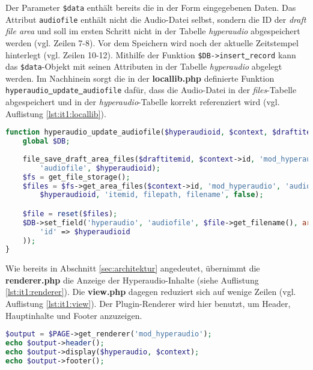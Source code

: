 Der Parameter \texttt{\$data} enthält bereits die in der Form eingegebenen Daten. Das Attribut \mbox{\texttt{audiofile}} enthält nicht die Audio-Datei selbst, sondern die ID der \textit{draft file area} und soll im ersten Schritt nicht in der Tabelle \textit{hyperaudio} abgespeichert werden (vgl. Zeilen 7-8). Vor dem Speichern wird noch der aktuelle Zeitstempel hinterlegt (vgl. Zeilen 10-12). Mithilfe der Funktion \mbox{\texttt{\$DB->insert\underline{{ }}record}} kann das \texttt{\$data}-Objekt mit seinen Attributen in der Tabelle \textit{hyperaudio} abgelegt werden. Im Nachhinein sorgt die in der \textbf{locallib.php} definierte Funktion \mbox{\texttt{hyperaudio\underline{{ }}update\underline{{ }}audiofile}} dafür, dass die Audio-Datei in der \textit{files}-Tabelle abgespeichert und in der \textit{hyperaudio}-Tabelle korrekt referenziert wird (vgl. Auflistung \ref{lst:it1:locallib}).

\begin{lstlisting}[language=php,
             linewidth=\textwidth,
             caption={Ausschnitt der \textbf{locallib.php} in der 1. Iteration},
             label={lst:it1:locallib}]
function hyperaudio_update_audiofile($hyperaudioid, $context, $draftitemid) {
    global $DB;
    
    file_save_draft_area_files($draftitemid, $context->id, 'mod_hyperaudio',
        'audiofile', $hyperaudioid);
    $fs = get_file_storage();
    $files = $fs->get_area_files($context->id, 'mod_hyperaudio', 'audiofile',
        $hyperaudioid, 'itemid, filepath, filename', false);

    $file = reset($files);
    $DB->set_field('hyperaudio', 'audiofile', $file->get_filename(), array(
        'id' => $hyperaudioid
    ));
}
\end{lstlisting}

Wie bereits in Abschnitt \ref{sec:architektur} angedeutet, übernimmt die \textbf{renderer.php} die Anzeige der Hyperaudio-Inhalte (siehe Auflistung \ref{lst:it1:renderer}). Die \textbf{view.php} dagegen reduziert sich auf wenige Zeilen (vgl. Auflistung \ref{lst:it1:view}). Der Plugin-Renderer wird hier benutzt, um Header, Hauptinhalte und Footer anzuzeigen.

\begin{lstlisting}[language=php,
deletekeywords={header},
             linewidth=\textwidth,
             caption={Ausschnitt der \textbf{view.php} in der 1. Iteration},
             label={lst:it1:view}]
$output = $PAGE->get_renderer('mod_hyperaudio');
echo $output->header();
echo $output->display($hyperaudio, $context);
echo $output->footer();
\end{lstlisting}

